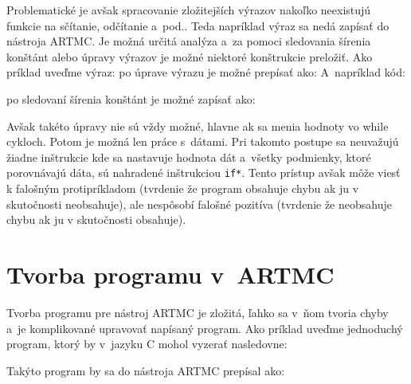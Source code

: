 Problematické je avšak spracovanie zložitejších výrazov nakoľko neexistujú funkcie na sčítanie, odčítanie a~pod.. Teda napríklad výraz
sa nedá zapísať do nástroja ARTMC. Je možná určitá analýza a~za pomoci sledovania šírenia konštánt alebo úpravy výrazov je možné niektoré konštrukcie preložiť.
\newpage
\noindent
Ako príklad uveďme výraz:  po úprave výrazu je možné prepísať ako: 
A~napríklad kód:


\noindent
po sledovaní šírenia konštánt je možné zapísať ako:


Avšak takéto úpravy nie sú vždy možné, hlavne ak sa menia hodnoty vo while cykloch. Potom je možná len  práce s~dátami. Pri takomto postupe sa neuvažujú žiadne inštrukcie kde sa nastavuje hodnota dát a~všetky podmienky, ktoré porovnávajú dáta, sú nahradené inštrukciou \texttt{if*}. Tento prístup avšak môže viesť k falošným protipríkladom (tvrdenie že program obsahuje chybu ak ju v skutočnosti neobsahuje), ale nespôsobí falošné pozitíva (tvrdenie že neobsahuje chybu ak ju v skutočnosti obsahuje).

\section{Tvorba programu v~ARTMC}
Tvorba programu pre nástroj ARTMC je zložitá, ľahko sa v~ňom tvoria chyby a~je komplikované
upravovať napísaný program.
Ako príklad uveďme jednoduchý program, ktorý by v~jazyku C mohol vyzerať nasledovne:


\noindent
Takýto program by sa do nástroja ARTMC prepísal ako:



